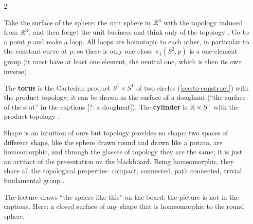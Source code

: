 \begin{paracol}{2}
\begin{example}\label{ex:iv-sphere}
Take the surface of the sphere: the unit sphere in $\mathbb{R}^3$ with the topology induced from $\mathbb{R}^3$, and then forget the unit business and think only of the topology .
Go to a point $p$ and make a loop. All loops are homotopic to each other, in particular to the constant curve at $p$; so there is only one class: $\pi_1(S^2,p)$ is a one-element group (it must have at least one element, the
neutral one, which is then its own inverse) .
\end{example}

\begin{definition}\label{def:iv-torus}
The \textbf{torus} is the Cartesian product $S^1\times S^1$ of two circles (\cref{sec:to-construct}) with the product topology; it can be drawn as the surface of a doughnut (``the surface of the stut'' in the captions [?: a doughnut]).
The \textbf{cylinder} is $\mathbb{R}\times S^1$ with the product topology .
\end{definition}
Shape is an intuition of ours but topology provides no shape: two spaces of different shape, like the sphere drawn round and drawn like a potato, are homeomorphic, and through the glasses of topology they are the same; it is just
an artifact of the presentation on the blackboard. Being homeomorphic, they share all the topological properties: compact, connected, path connected, trivial fundamental group .
\begin{coursenote}
The lecture draws ``the sphere like this'' on the board; the picture is not in the captions. Here: a closed surface of any shape that is homeomorphic to the round sphere.
\end{coursenote}


\end{paracol}
